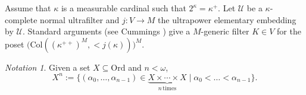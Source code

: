 \documentclass[11pt]{amsart}
\theoremstyle{definition}
\theoremstyle{remark}
\newtheorem{notation}[theorem]{Notation}
\def\s{\subseteq}
\begin{document}
\smallskip



 Assume that $\kappa$ is a measurable cardinal such that $2^\kappa=\kappa^+$. Let $\mathcal{U}$ be a $\kappa$-complete normal ultrafilter and $j\colon V\to M$  the ultrapower elementary embedding by $\mathcal{U}$. Standard arguments (see Cummings \cite[\S8]{CummingsHandbook}) give a $M$-generic filter $K\in V$  for the poset $\big(\mathrm{Col}((\kappa^{++})^{M},{<}j(\kappa))\big)^{M}$. 
 

\begin{notation}
   Given a set $X\s \mathrm{Ord}$ and $n<\omega$, 
   $$X^n:=\{(\alpha_0,\dots, \alpha_{n-1})\in \underbrace{X\times\cdots \times X}_{n\, \text{times}}\mid \alpha_0<\dots<\alpha_{n-1}\}.$$
\end{notation}

\smallskip
\end{document}
